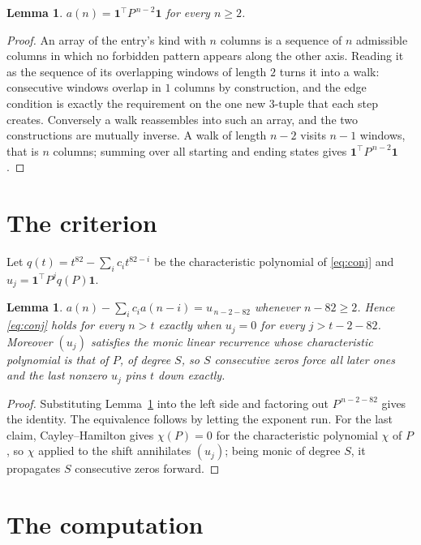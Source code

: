 \documentclass[11pt,a4paper]{article}
\theoremstyle{plain}
\newtheorem{lemma}[theorem]{Lemma}
\theoremstyle{definition}
\begin{document}
\begin{lemma}\label{lem:walk}
$a(n)=\mathbf{1}^{\!\top}P^{\,n-2}\mathbf{1}$ for every $n\ge2$.
\end{lemma}

\begin{proof}
An array of the entry's kind with $n$ columns is a sequence of $n$ admissible columns in
which no forbidden pattern appears along the other axis. Reading it as the sequence of its
overlapping windows of length $2$ turns it into a walk: consecutive windows overlap in
$1$ columns by construction, and the edge condition is exactly the requirement on the one
new $3$-tuple that each step creates. Conversely a walk reassembles into such an array,
and the two constructions are mutually inverse. A walk of length $n-2$ visits $n-1$
windows, that is $n$ columns; summing over all starting and ending states gives
$\mathbf{1}^{\!\top}P^{\,n-2}\mathbf{1}$.
\end{proof}

\section{The criterion}

Let $q(t)=t^{82}-\sum_i c_i t^{82-i}$ be the characteristic polynomial of
\eqref{eq:conj} and $u_j=\mathbf{1}^{\!\top}P^{j}q(P)\mathbf{1}$.

\begin{lemma}\label{lem:crit}
$a(n)-\sum_i c_i a(n-i)=u_{\,n-2-82}$ whenever $n-82\ge2$. Hence
\eqref{eq:conj} holds for every $n>t$ exactly when $u_j=0$ for every
$j>t-2-82$. Moreover $(u_j)$ satisfies the monic linear recurrence whose
characteristic polynomial is that of $P$, of degree $S$, so $S$ consecutive zeros force all
later ones and the last nonzero $u_j$ pins $t$ down exactly.
\end{lemma}

\begin{proof}
Substituting Lemma~\ref{lem:walk} into the left side and factoring out
$P^{\,n-2-82}$ gives the identity. The equivalence follows by letting the exponent
run. For the last claim, Cayley--Hamilton gives $\chi(P)=0$ for the characteristic
polynomial $\chi$ of $P$, so $\chi$ applied to the shift annihilates $(u_j)$; being monic of
degree $S$, it propagates $S$ consecutive zeros forward.
\end{proof}

\section{The computation}
\end{document}
